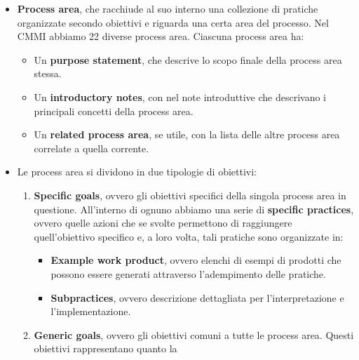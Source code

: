 \begin{itemize}
      \item \textbf{Process area}, che racchiude al suo interno una collezione di
            pratiche organizzate secondo obiettivi e riguarda una certa area del
            processo. Nel CMMI abbiamo 22 diverse process area. Ciascuna process
            area ha:
            \begin{itemize}
                  \item Un \textbf{purpose statement}, che descrive lo scopo finale
                        della process area stessa.
                  \item Un \textbf{introductory notes}, con nel note introduttive
                        che descrivano i principali concetti della process area.
                  \item Un \textbf{related process area}, se utile, con la lista
                        delle altre process area correlate a quella corrente.
            \end{itemize}
      \item Le process area si dividono in due tipologie di obiettivi:
            \begin{enumerate}
                  \item \textbf{Specific goals}, ovvero gli obiettivi specifici
                        della singola process area in questione. All'interno di
                        ognuno abbiamo una serie di \textbf{specific practices},
                        ovvero quelle azioni che se svolte permettono di raggiungere
                        quell'obiettivo specifico e, a loro volta, tali pratiche
                        sono organizzate in:
                        \begin{itemize}
                              \item \textbf{Example work product}, ovvero elenchi
                                    di esempi di prodotti che possono essere generati
                                    attraverso l'adempimento delle pratiche.
                              \item \textbf{Subpractices}, ovvero descrizione
                                    dettagliata per l'interpretazione e l'implementazione.
                        \end{itemize}
                  \item \textbf{Generic goals}, ovvero gli obiettivi comuni a tutte
                        le process area. Questi obiettivi rappresentano quanto la

\end{enumerate}
\end{itemize}
